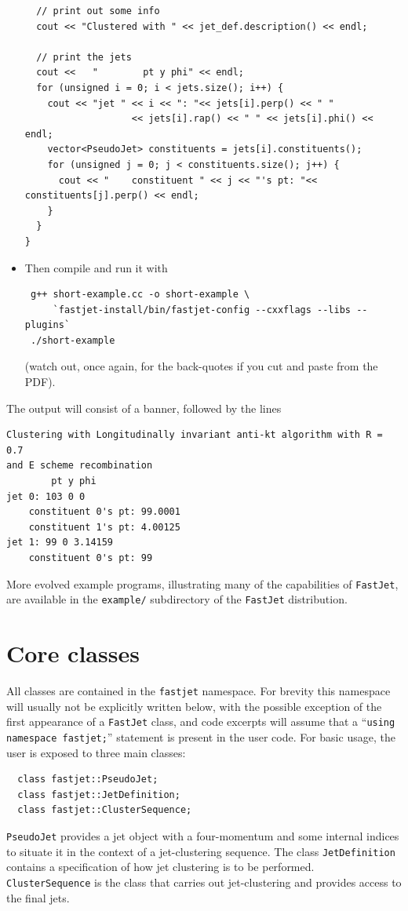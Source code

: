 \documentclass[12pt,a4]{article}
\newcommand{\fastjet}{\texttt{FastJet}\xspace}
\newcommand{\ttt}[1]{{\small\texttt{#1}}}
\begin{document}
\begin{itemize}
\begin{lstlisting}
  // print out some info
  cout << "Clustered with " << jet_def.description() << endl;

  // print the jets
  cout <<   "        pt y phi" << endl;
  for (unsigned i = 0; i < jets.size(); i++) {
    cout << "jet " << i << ": "<< jets[i].perp() << " " 
                   << jets[i].rap() << " " << jets[i].phi() << endl;
    vector<PseudoJet> constituents = jets[i].constituents();
    for (unsigned j = 0; j < constituents.size(); j++) {
      cout << "    constituent " << j << "'s pt: "<< constituents[j].perp() << endl;
    }
  }
}
\end{lstlisting}

\item \rm Then compile and run it with
\begin{verbatim}
 g++ short-example.cc -o short-example \
     `fastjet-install/bin/fastjet-config --cxxflags --libs --plugins`
 ./short-example
\end{verbatim}
(watch out, once again, for the back-quotes if you cut and paste from the PDF).
\end{itemize}
\noindent
The output will consist of a banner, followed by the lines
\begin{verbatim}
Clustering with Longitudinally invariant anti-kt algorithm with R = 0.7 
and E scheme recombination
        pt y phi
jet 0: 103 0 0
    constituent 0's pt: 99.0001
    constituent 1's pt: 4.00125
jet 1: 99 0 3.14159
    constituent 0's pt: 99
\end{verbatim}

More evolved example programs, illustrating many of the capabilities of \fastjet,
are available in the \ttt{example/} subdirectory of the
\fastjet distribution.

\section{Core classes}
\label{sec:core-classes}

All classes are contained in the \ttt{fastjet} namespace. For brevity this namespace
will usually not be explicitly written below, with the possible exception of the first
appearance of a \fastjet class, and code excerpts will
assume that a ``\ttt{using namespace fastjet;}'' statement is present in the user
code.
For basic
usage, the user is exposed to three main classes:
\begin{lstlisting}
  class fastjet::PseudoJet;
  class fastjet::JetDefinition;
  class fastjet::ClusterSequence;
\end{lstlisting}
\ttt{PseudoJet} provides a jet object with a four-momentum and some
internal indices to situate it in the context of a jet-clustering
sequence. 
%
The class \ttt{JetDefinition} contains a specification of how
jet clustering is to be performed. 
%
\ttt{ClusterSequence} is the class that carries out
jet-clustering and provides access to the final jets.
\end{document}
